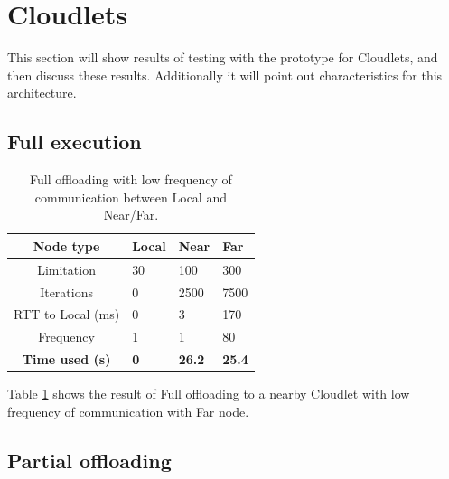 

\section{Cloudlets}

This section will show results of testing with the prototype for Cloudlets, and then discuss these results. Additionally it will point out characteristics for this architecture.


\subsection{Full execution}


\begin{table}[h!]
    \centering
    \begin{tabular}[c]{|c||p{2cm}|p{2cm}|p{2cm}|}
        \hline
        Node type & Local & Near & Far \\
        \hline
        Limitation          & 30 & 100 & 300  \\
        \hline
        Iterations          & 0 & 2500 & 7500  \\
        \hline
        RTT to Local (ms)   & 0 & 3 & 170 \\
        \hline
        Frequency           & 1 & 1 & 80 \\
        \hline
        \hline
        \hline
        \textbf{Time used (s)}       & \textbf{0} & \textbf{26.2} & \textbf{25.4} \\
        \hline
    \end{tabular}
    \caption{Full offloading with low frequency of communication between Local and Near/Far.}
    \label{tab:Cloudlet_full_offloading_low_frequency}
\end{table}

Table \ref{tab:Cloudlet_full_offloading_low_frequency} shows the result of Full offloading to a nearby Cloudlet with low frequency of communication with Far node.







\subsection{Partial offloading}



